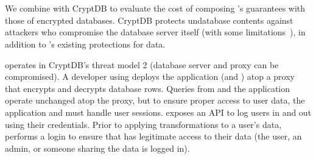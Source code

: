 \section{\syscrypt}
\label{s:eval-cryptdb}

We combine \sys with CryptDB to evaluate the cost of composing \sys's guarantees
with those of encrypted databases.
%
%
CryptDB protects un\xxed database contents against attackers who compromise
the database server itself (with some limitations~\cite{grubbs}), in addition
to \sys's existing protections for \xxed data.
%
%

%
\syscrypt operates in CryptDB's threat model 2 (database server and proxy can be
compromised).
%
A developer using \syscrypt deploys the application (and \sys) atop a proxy that
encrypts and decrypts database rows.
%
%
%
%
%
%
Queries from \sys and the application operate unchanged atop the proxy, but to
ensure proper access to user data, the application and \sys must handle user
sessions.
%
\syscrypt exposes an API to log users in and out using their credentials.  Prior to applying
transformations to a user's data, \sys performs a login to ensure that \sys has
legitimate access to their data (\eg the user, an admin, or someone sharing the
data is logged in).

